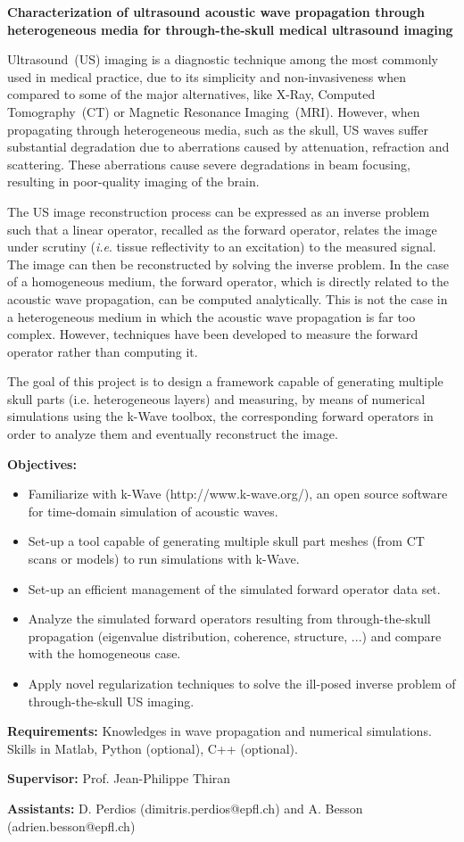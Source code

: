 \documentclass{article}
\begin{document}
\textbf{Characterization of ultrasound acoustic wave propagation through heterogeneous media for through-the-skull medical ultrasound imaging}

\vspace{\baselineskip} 
\par Ultrasound~(US) imaging is a diagnostic technique among the most commonly used in medical practice, due to its simplicity and non-invasiveness when compared to some of the major alternatives, like X-Ray, Computed Tomography~(CT) or Magnetic Resonance Imaging~(MRI). However, when propagating through heterogeneous media, such as the skull, US waves suffer substantial degradation due to aberrations caused by attenuation, refraction and scattering. These aberrations cause severe degradations in beam focusing, resulting in poor-quality imaging of the brain.

\par The US image reconstruction process can be expressed as an inverse problem such that a linear operator, recalled as the forward operator, relates the image under scrutiny (\textit{i.e}. tissue reflectivity to an excitation) to the measured signal. The image can then be reconstructed by solving the inverse problem. In the case of a homogeneous medium, the forward operator, which is directly related to the acoustic wave propagation, can be computed analytically. This is not the case in a heterogeneous medium in which the acoustic wave propagation is far too complex. However, techniques have been developed to measure the forward operator rather than computing it.

\vspace{\baselineskip} 
The goal of this project is to design a framework capable of generating multiple skull parts (i.e. heterogeneous layers) and measuring, by means of numerical simulations using the k-Wave toolbox, the corresponding forward operators in order to analyze them and eventually reconstruct the image.

\vspace{\baselineskip}  
\textbf{Objectives:}
\begin{itemize}
	\item Familiarize with k-Wave (http://www.k-wave.org/), an open source software for time-domain simulation of acoustic waves.
	\item Set-up a tool capable of generating multiple skull part meshes (from CT scans or models) to run simulations with k-Wave.
	\item Set-up an efficient management of the simulated forward operator data set.
	\item Analyze the simulated forward operators resulting from through-the-skull propagation (eigenvalue distribution, coherence, structure, ...) and compare with the homogeneous case.
	\item Apply novel regularization techniques to solve the ill-posed inverse problem of through-the-skull US imaging.
\end{itemize}

\textbf{Requirements:} Knowledges in wave propagation and numerical simulations. Skills in Matlab, Python (optional), C++ (optional).

\textbf{Supervisor:} Prof. Jean-Philippe Thiran

\textbf{Assistants:} D. Perdios (dimitris.perdios@epfl.ch) and A. Besson (adrien.besson@epfl.ch)
\end{document}
